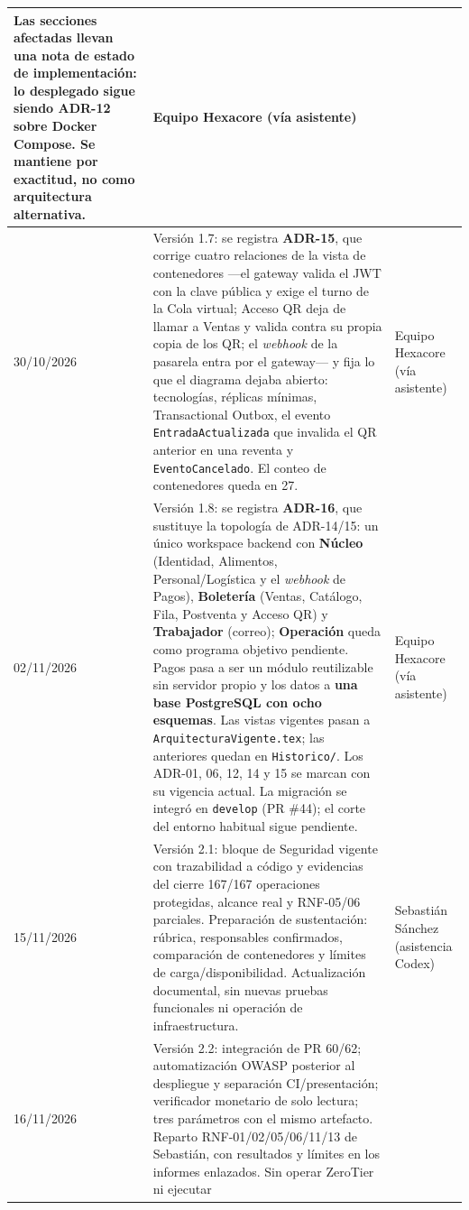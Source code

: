 \documentclass[11pt,a4paper]{article}
\begin{document}
\begin{center}
\begin{longtable}{|p{2.5cm}|p{7cm}|p{4cm}|}
Las secciones afectadas llevan una nota de \textbf{estado de implementación}: lo desplegado sigue
siendo ADR-12 sobre Docker Compose. Se mantiene por exactitud, no como arquitectura alternativa.
& Equipo Hexacore (vía asistente) \\
\hline
30/10/2026 & Versión 1.7: se registra \textbf{ADR-15}, que corrige cuatro relaciones de la vista
de contenedores ---el gateway valida el JWT con la clave pública y exige el turno de la Cola
virtual; Acceso QR deja de llamar a Ventas y valida contra su propia copia de los QR; el
\textit{webhook} de la pasarela entra por el gateway--- y fija lo que el diagrama dejaba abierto:
tecnologías, réplicas mínimas, Transactional Outbox, el evento \texttt{EntradaActualizada} que
invalida el QR anterior en una reventa y \texttt{EventoCancelado}. El conteo de contenedores queda
en 27. & Equipo Hexacore (vía asistente) \\
\hline
02/11/2026 & Versión 1.8: se registra \textbf{ADR-16}, que sustituye la topología de ADR-14/15:
un único workspace backend con \textbf{Núcleo} (Identidad, Alimentos, Personal/Logística y el
\textit{webhook} de Pagos), \textbf{Boletería} (Ventas, Catálogo, Fila, Postventa y Acceso QR) y
\textbf{Trabajador} (correo); \textbf{Operación} queda como programa objetivo pendiente. Pagos pasa
a ser un módulo reutilizable sin servidor propio y los datos a \textbf{una base PostgreSQL con ocho
esquemas}. Las vistas vigentes pasan a \texttt{ArquitecturaVigente.tex}; las anteriores quedan en
\texttt{Historico/}. Los ADR-01, 06, 12, 14 y 15 se marcan con su vigencia actual. La migración se
integró en \texttt{develop} (PR \#44); el corte del entorno habitual sigue pendiente.
& Equipo Hexacore (vía asistente) \\
\hline
15/11/2026 & Versión 2.1: bloque de Seguridad vigente con trazabilidad a código y
evidencias del cierre 167/167 operaciones protegidas, alcance real y RNF-05/06
parciales. Preparación de sustentación: rúbrica, responsables confirmados,
comparación de contenedores y límites de carga/disponibilidad. Actualización
documental, sin nuevas pruebas funcionales ni operación de infraestructura.
& Sebastián Sánchez (asistencia Codex) \\
\hline
16/11/2026 & Versión 2.2: integración de PR 60/62; automatización OWASP posterior
al despliegue y separación CI/presentación; verificador monetario de solo lectura;
tres parámetros con el mismo artefacto. Reparto RNF-01/02/05/06/11/13 de Sebastián,
con resultados y límites en los informes enlazados. Sin operar ZeroTier ni ejecutar

\end{longtable}
\end{center}
\end{document}
